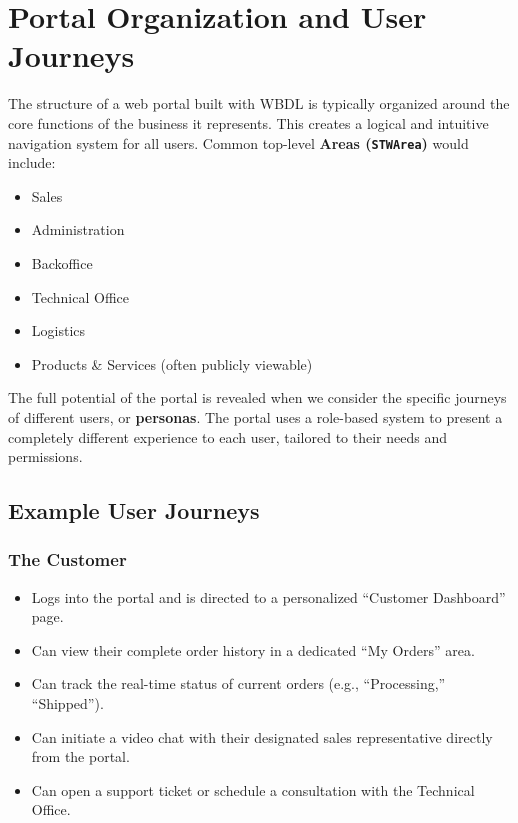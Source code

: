 \section{Portal Organization and User Journeys}

The structure of a web portal built with WBDL is typically organized around the core functions of the business it represents. This creates a logical and intuitive navigation system for all users. Common top-level \textbf{Areas (\texttt{STWArea})} would include:

\begin{itemize}
\item Sales
\item Administration
\item Backoffice
\item Technical Office
\item Logistics
\item Products \& Services (often publicly viewable)
\end{itemize}

The full potential of the portal is revealed when we consider the specific journeys of different users, or \textbf{personas}. The portal uses a role-based system to present a completely different experience to each user, tailored to their needs and permissions.

\subsection{Example User Journeys}

\subsubsection{The Customer}
\begin{itemize}
\item Logs into the portal and is directed to a personalized ``Customer Dashboard'' page.
\item Can view their complete order history in a dedicated ``My Orders'' area.
\item Can track the real-time status of current orders (e.g., ``Processing,'' ``Shipped'').
\item Can initiate a video chat with their designated sales representative directly from the portal.
\item Can open a support ticket or schedule a consultation with the Technical Office.
\end{itemize}

